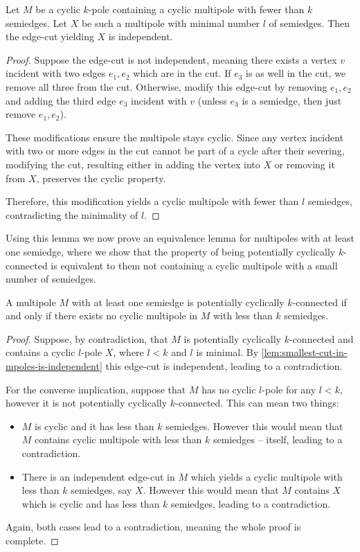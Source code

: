 \documentclass[12pt, twoside]{book}
\begin{document}
\begin{lemma}\label{lem:smallest-cut-in-mpoles-is-independent}
	Let $M$ be a cyclic $k$-pole containing a cyclic multipole with fewer than $k$ semiedges. Let $X$ be such a multipole with minimal number $l$ of semiedges. Then the edge-cut yielding $X$ is independent.
\end{lemma}

\begin{proof}
	Suppose the edge-cut is not independent, meaning there exists a vertex $v$ incident with two edges $e_1,e_2$ which are in the cut. If $e_3$ is as well in the cut, we remove all three from the cut. Otherwise, modify this edge-cut by removing $e_1,e_2$ and adding the third edge $e_3$ incident with $v$ (unless $e_3$ is a semiedge, then just remove $e_1,e_2$).
	
	These modifications ensure the multipole stays cyclic. Since any vertex incident with two or more edges in the cut cannot be part of a cycle after their severing, modifying the cut, resulting either in adding the vertex into $X$ or removing it from $X$, preserves the cyclic property.
	
	Therefore, this modification yields a cyclic multipole with fewer than $l$ semiedges, contradicting the minimality of $l$.
\end{proof}

Using this lemma we now prove an equivalence lemma for multipoles with at least one semiedge, where we show that the property of being potentially cyclically \mbox{$k$-connected} is equivalent to them not containing a cyclic multipole with a small number of semiedges.

\begin{lemma}
	A multipole $M$ with at least one semiedge is potentially cyclically $k$-connected if and only if  there exists no cyclic multipole in $M$ with less than $k$ semiedges.
\end{lemma}

\begin{proof}
	Suppose, by contradiction, that $M$ is potentially cyclically $k$-connected and contains a cyclic \mbox{$l$-pole} $X$, where $l<k$ and $l$ is minimal. By \cref{lem:smallest-cut-in-mpoles-is-independent} this edge-cut is independent, leading to a contradiction.
	
	For the converse implication, suppose that $M$ has no cyclic $l$-pole for any $l<k$, however it is not potentially cyclically $k$-connected. This can mean two things:
	\begin{itemize}
		\item $M$ is cyclic and it has less than $k$ semiedges. However this would mean that $M$ contains cyclic multipole with less than $k$ semiedges -- itself, leading to a contradiction.
		\item There is an independent edge-cut in $M$ which yields a cyclic multipole with less than $k$ semiedges, say $X$. However this would mean that $M$ contains $X$ which is cyclic and has less than $k$ semiedges, leading to a contradiction.
	\end{itemize}
	
	Again, both cases lead to a contradiction, meaning the whole proof is complete.
\end{proof}
\end{document}
